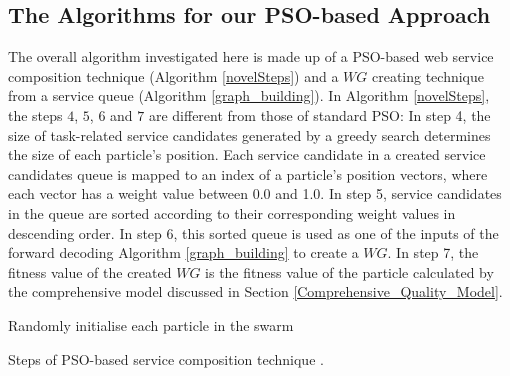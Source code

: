 \documentclass{llncs}
\begin{document}
\subsection{The Algorithms for our PSO-based Approach}\label{POS-based_algomargin}
The overall algorithm investigated here is made up of a PSO-based web service composition technique (Algorithm \ref{novelSteps}) and a $WG$ creating technique from a service queue (Algorithm \ref{graph_building}). In Algorithm \ref{novelSteps}, the  steps $4$, $5$, $6$ and $7$ are different from those of standard PSO: In step 4, the size of task-related service candidates generated by a greedy search determines the size of each particle's position. Each service candidate in a created service candidates queue is mapped to an index of a particle’s position vectors, where each vector has a weight value between 0.0 and 1.0. In step 5, service candidates in the queue are sorted according to their corresponding weight values in descending order. In step 6, this sorted queue is used as one of the inputs of the forward decoding Algorithm \ref{graph_building} to create a $WG$. In step 7, the fitness value of the created $WG$ is the fitness value of the particle calculated by the comprehensive model discussed in Section \ref{Comprehensive_Quality_Model}.
\vspace{-0.5cm}
\begin{algorithm}
 \SetNlSty{}{}{:}
 Randomly initialise each particle in the swarm\;
\caption{Steps of PSO-based service composition technique \cite{da2016particle}.}
\label{novelSteps}
\end{algorithm} 
\end{document}

